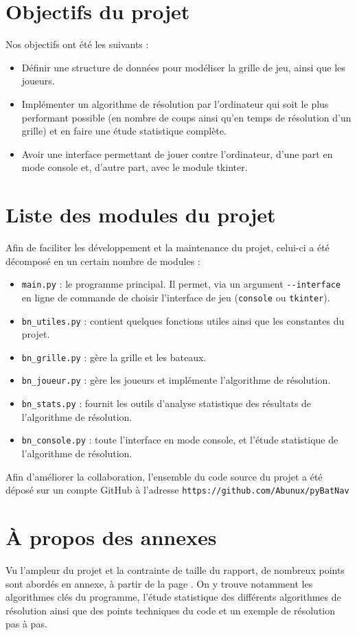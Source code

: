 \section{Objectifs du projet}
Nos objectifs ont été les suivants :
\begin{itemize}
\item Définir une structure de données pour modéliser la grille de jeu, ainsi que les joueurs.
\item Implémenter un algorithme de résolution par l'ordinateur qui soit le plus performant possible (en nombre de coups ainsi qu'en temps de résolution d'un grille) et en faire une étude statistique complète.
\item Avoir une interface permettant de jouer contre l'ordinateur, d'une part en mode console et, d'autre part, avec le module tkinter. 
\end{itemize}

\section{Liste des modules du projet}
Afin de faciliter les développement et la maintenance du projet, celui-ci a été décomposé en un certain nombre de modules :
\begin{itemize}
\item \texttt{main.py} : le programme principal. Il permet, via un argument \texttt{-\hspace*{1pt}-interface} en ligne de commande de choisir l'interface de jeu (\texttt{console} ou \texttt{tkinter}).
\item \texttt{bn\_utiles.py} : contient quelques fonctions utiles ainsi que les constantes du projet.
\item \texttt{bn\_grille.py} : gère la grille et les bateaux.
\item \texttt{bn\_joueur.py} : gère les joueurs et implémente l'algorithme de résolution.
\item \texttt{bn\_stats.py} : fournit les outils d'analyse statistique des résultats de l'algorithme de résolution.
\item \texttt{bn\_console.py} : toute l'interface en mode console, et l'étude statistique de l'algorithme de résolution.
\end{itemize}

\bigskip

Afin d'améliorer la collaboration, l'ensemble du code source du projet a été déposé sur un compte GitHub à l'adresse \texttt{https://github.com/Abunux/pyBatNav}

\section{À propos des annexes}
Vu l'ampleur du projet et la contrainte de taille du rapport, de nombreux points sont abordés en annexe, à partir de la page \pageref{annexes}. On y trouve notamment les algorithmes clés du programme, l'étude statistique des différents algorithmes de résolution ainsi que des points techniques du code et un exemple de résolution pas à pas.
